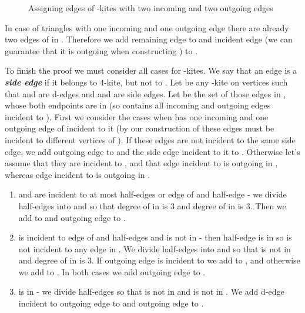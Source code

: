 \documentclass[a4, 11pt]{article}
\newcommand{\<}{\langle}
\renewcommand{\>}{\rangle}
\begin{document}
\begin{figure}[h!]
	
	
	
	\caption{Assigning edges of -kites with two incoming and two outgoing edges}
	\label{fig:triangles_2out2in}
\end{figure}

In case of triangles with one incoming and one outgoing edge there are already two edges of  in . Therefore we add remaining edge to  and incident edge (we can guarantee that it is outgoing when constructing ) to .

To finish the proof we must consider all cases for -kites.
We say that an edge  is a {\bf \em side edge} if it belongs to 4-kite, but not to . Let  be any -kite on vertices  such that  and  are d-edges and  and  are side edges. Let  be the set of those edges in , whose both endpoints are in  (so  contains all incoming and outgoing edges incident to ). First we consider the cases when  has one incoming and one outgoing edge of  incident to it (by our construction of  these edges must be incident to different vertices of ). If these edges are not incident to the same side edge, we add outgoing edge to  and the side edge incident to it to . Otherwise let's assume that they are incident to , and that edge incident to  is outgoing in , whereas edge incident to  is outgoing in .
\begin{enumerate}
	\item  and  are incident to at most  half-edges or  edge of  and  half-edge - we divide half-edges into  and  so that degree of  in  is 3 and degree of  in  is 3. Then we add  to  and outgoing edge to .
	\item  is incident to  edge of  and  half-edges and  is not in  - then half-edge  is in  so  is not incident to any edge in . We divide half-edges into  and  so that  is not in  and degree of  in  is 3. If outgoing edge is incident to  we add  to , and otherwise we add  to . In both cases we add outgoing edge to .
	\item  is in  - we divide half-edges so that  is not in  and  is not in . We add d-edge incident to outgoing edge to  and outgoing edge to .
\end{enumerate}
\end{document}
